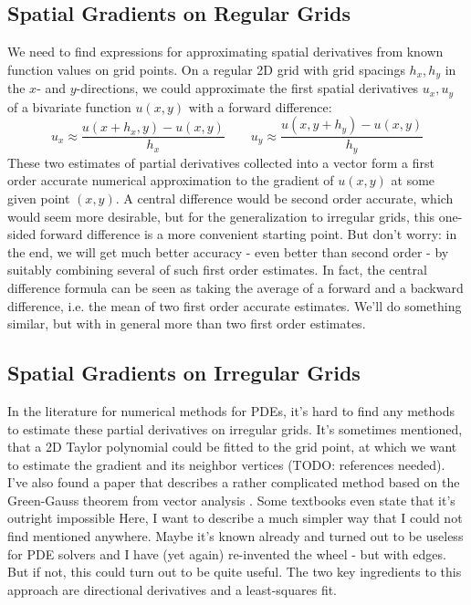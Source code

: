 \subsection{Spatial Gradients on Regular Grids}
We need to find expressions for approximating spatial derivatives from known function values on grid points. On a regular 2D grid with grid spacings $h_x, h_y$ in the $x$- and $y$-directions, we could approximate the first spatial derivatives $u_x,u_y$ of a bivariate function $u(x,y)$ with a forward difference:
\begin{equation}
  u_x \approx \frac{u(x+h_x,y) - u(x,y)} {h_x}  \qquad
  u_y \approx \frac{u(x,y+h_y) - u(x,y)} {h_y}
\end{equation}
These two estimates of partial derivatives collected into a vector form a first order accurate numerical approximation to the gradient of $u(x,y)$ at some given point $(x,y)$. A central difference would be second order accurate, which would seem more desirable, but for the generalization to irregular grids, this one-sided forward difference is a more convenient starting point. But don't worry: in the end, we will get much better accuracy - even better than second order - by suitably combining several of such first order estimates. In fact, the central difference formula can be seen as taking the average of a forward and a backward difference, i.e. the mean of two first order accurate estimates. We'll do something similar, but with in general more than two first order estimates.

\subsection{Spatial Gradients on Irregular Grids}
In the literature for numerical methods for PDEs, it's hard to find any methods to estimate these partial derivatives on irregular grids. It's sometimes mentioned, that a 2D Taylor polynomial could be fitted to the grid point, at which we want to estimate the gradient and its neighbor vertices (TODO: references needed). I've also found a paper that describes a rather complicated method based on the Green-Gauss theorem from vector analysis \cite{Xu}. Some textbooks even state that it's outright impossible \cite{Munz} Here, I want to describe a much simpler way that I could not find mentioned anywhere. Maybe it's known already and turned out to be useless for PDE solvers and I have (yet again) re-invented the wheel - but with edges. But if not, this could turn out to be quite useful. The two key ingredients to this approach are directional derivatives and a least-squares fit.

